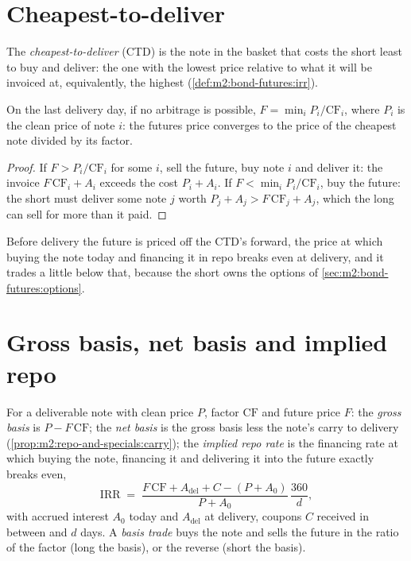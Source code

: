 \section{Cheapest-to-deliver}

\begin{definition}\label{def:m2:bond-futures:ctd}
The \emph{cheapest-to-deliver} (CTD) is the note in
the basket that costs the short least to buy and deliver: the one with the
lowest price relative to what it will be invoiced at, equivalently, the
highest  (\cref{def:m2:bond-futures:irr}).
\end{definition}

\begin{proposition}[At delivery]\label{prop:m2:bond-futures:atdelivery}
On the last delivery day, if no arbitrage is possible, $F = \min_i
P_i/\mathrm{CF}_i$, where $P_i$ is the clean price of note $i$: the futures
price converges to the price of the cheapest note divided by its factor.
\end{proposition}
\begin{proof}
If $F > P_i/\mathrm{CF}_i$ for some $i$, sell the future, buy note $i$ and
deliver it: the invoice $F\,\mathrm{CF}_i + A_i$ exceeds the cost $P_i + A_i$. If
$F < \min_i P_i/\mathrm{CF}_i$, buy the future: the short must deliver some note
$j$ worth $P_j + A_j > F\,\mathrm{CF}_j + A_j$, which the long can sell for more
than it paid.
\end{proof}

Before delivery the future is priced off the CTD's forward, the price at which
buying the note today and financing it in repo breaks even at delivery, and
it trades a little below that, because the short owns the options of
\cref{sec:m2:bond-futures:options}.

\section{Gross basis, net basis and implied repo}

\begin{definition}\label{def:m2:bond-futures:irr}
For a deliverable note with clean price $P$, factor $\mathrm{CF}$ and future
price $F$: the \emph{gross basis} is $P - F\,\mathrm{CF}$;
the \emph{net basis} is the gross basis less the note's carry
to delivery (\cref{prop:m2:repo-and-specials:carry}); the \emph{implied repo
rate} is the financing rate at which buying the note,
financing it and delivering it into the future exactly breaks even,
\[
\text{IRR} \;=\; \frac{F\,\mathrm{CF} + A_{\text{del}} + C - (P + A_0)}{P + A_0}\,\frac{360}{d},
\]
with accrued interest $A_0$ today and $A_{\text{del}}$ at delivery, coupons
$C$ received in between and $d$ days. A \emph{basis trade}
buys the note and sells the future in the ratio of the factor (long the
basis), or the reverse (short the basis).
\end{definition}

